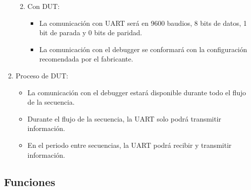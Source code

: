 \documentclass[
11pt, %
]{charter}
\begin{document}
\begin{enumerate}
\begin{enumerate}
\begin{itemize}
\begin{itemize}
			\end{itemize}
		\end{itemize}
		\item Con DUT:
		\begin{itemize}
			\item La comunicación con UART será en 9600 baudios, 8 bits de datos, 1 bit de parada y 0 bits de paridad.
			\item La comunicación con el debugger se conformará con la configuración recomendada por el fabricante.
		\end{itemize}
	\end{enumerate}
	\item Proceso de DUT:
	\begin{itemize}
		\item La comunicación con el debugger estará disponible durante todo el flujo de la secuencia.
		\item Durante el flujo de la secuencia, la UART solo podrá transmitir información.
		\item En el periodo entre secuencias, la UART podrá recibir y transmitir información.
	\end{itemize}
\end{enumerate}

\subsection{Funciones}
\label{sub:funciones}
\end{document}

